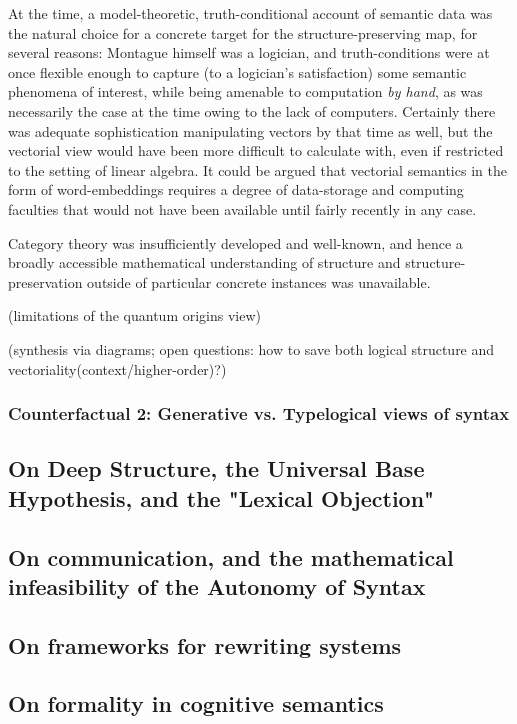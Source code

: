 At the time, a model-theoretic, truth-conditional account of semantic data was the natural choice for a concrete target for the structure-preserving map, for several reasons: Montague himself was a logician, and truth-conditions were at once flexible enough to capture (to a logician's satisfaction) some semantic phenomena of interest, while being amenable to computation \emph{by hand}, as was necessarily the case at the time owing to the lack of computers. Certainly there was adequate sophistication manipulating vectors by that time as well, but the vectorial view would have been more difficult to calculate with, even if restricted to the setting of linear algebra. It could be argued that vectorial semantics in the form of word-embeddings requires a degree of data-storage and computing faculties that would not have been available until fairly recently in any case.

 Category theory was insufficiently developed and well-known, and hence a broadly accessible mathematical understanding of structure and structure-preservation outside of particular concrete instances was unavailable.

(limitations of the quantum origins view)

(synthesis via diagrams; open questions: how to save both logical structure and vectoriality(context/higher-order)?)

\subsubsection{Counterfactual 2: Generative vs. Typelogical views of syntax}

\subsection{On Deep Structure, the Universal Base Hypothesis, and the "Lexical Objection"}

\subsection{On communication, and the mathematical infeasibility of the Autonomy of Syntax}

\subsection{On frameworks for rewriting systems}

\subsection{On formality in cognitive semantics}

